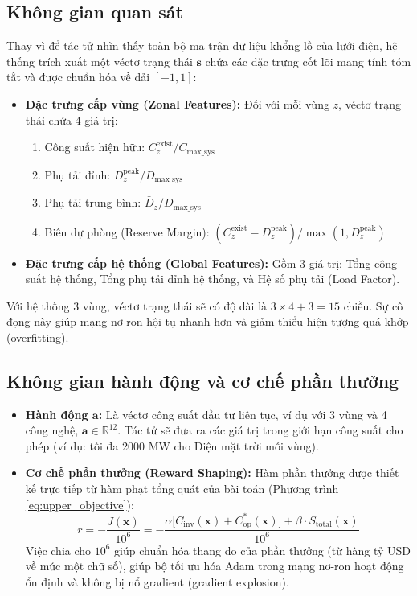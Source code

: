 \subsection{Không gian quan sát}
Thay vì để tác tử nhìn thấy toàn bộ ma trận dữ liệu khổng lồ của lưới điện, hệ thống trích xuất một véctơ trạng thái $\mathbf{s}$ chứa các đặc trưng cốt lõi mang tính tóm tắt và được chuẩn hóa về dải $[-1, 1]$:
\begin{itemize}
    \item \textbf{Đặc trưng cấp vùng (Zonal Features):} Đối với mỗi vùng $z$, véctơ trạng thái chứa 4 giá trị:
    \begin{enumerate}
        \item Công suất hiện hữu: $C_{z}^{\text{exist}} / C_{\text{max\_sys}}$
        \item Phụ tải đỉnh: $D_{z}^{\text{peak}} / D_{\text{max\_sys}}$
        \item Phụ tải trung bình: $\bar{D}_{z} / D_{\text{max\_sys}}$
        \item Biên dự phòng (Reserve Margin): $(C_{z}^{\text{exist}} - D_{z}^{\text{peak}}) / \max(1, D_{z}^{\text{peak}})$
    \end{enumerate}
    \item \textbf{Đặc trưng cấp hệ thống (Global Features):} Gồm 3 giá trị: Tổng công suất hệ thống, Tổng phụ tải đỉnh hệ thống, và Hệ số phụ tải (Load Factor).
\end{itemize}
Với hệ thống 3 vùng, véctơ trạng thái sẽ có độ dài là $3 \times 4 + 3 = 15$ chiều. Sự cô đọng này giúp mạng nơ-ron hội tụ nhanh hơn và giảm thiểu hiện tượng quá khớp (overfitting).

\subsection{Không gian hành động và cơ chế phần thưởng}
\begin{itemize}
    \item \textbf{Hành động $\mathbf{a}$:} Là véctơ công suất đầu tư liên tục, ví dụ với 3 vùng và 4 công nghệ, $\mathbf{a} \in \mathbb{R}^{12}$. Tác tử sẽ đưa ra các giá trị trong giới hạn công suất cho phép (ví dụ: tối đa 2000 MW cho Điện mặt trời mỗi vùng).
    \item \textbf{Cơ chế phần thưởng (Reward Shaping):} Hàm phần thưởng được thiết kế trực tiếp từ hàm phạt tổng quát của bài toán (Phương trình \ref{eq:upper_objective}):
    \begin{equation}
        r = - \frac{J(\mathbf{x})}{10^6} = - \frac{\alpha \big[C_{\text{inv}}(\mathbf{x}) + C_{\text{op}}^*(\mathbf{x})\big] + \beta \cdot S_{\text{total}}(\mathbf{x})}{10^6}
    \end{equation}
    Việc chia cho $10^6$ giúp chuẩn hóa thang đo của phần thưởng (từ hàng tỷ USD về mức một chữ số), giúp bộ tối ưu hóa Adam trong mạng nơ-ron hoạt động ổn định và không bị nổ gradient (gradient explosion).
\end{itemize}

